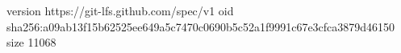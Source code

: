version https://git-lfs.github.com/spec/v1
oid sha256:a09ab13f15b62525ee649a5c7470c0690b5c52a1f9991c67e3cfca3879d46150
size 11068
